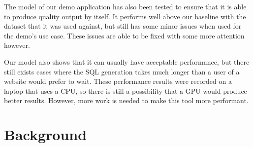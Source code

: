 \documentclass[11pt]{article}
\begin{document}
The model of our demo application has also been tested to ensure that it is able to produce quality output by itself. It performs well above our baseline with the dataset that it was used against, but still has some minor issues when used for the demo's use case. These issues are able to be fixed with some more attention however.

Our model also shows that it can usually have acceptable performance, but there still exists cases where the SQL generation takes much longer than a user of a website would prefer to wait. These performance results were recorded on a laptop that uses a CPU, so there is still a possibility that a GPU would produce better results. However, more work is needed to make this tool more performant.






\section{Background}
\end{document}

